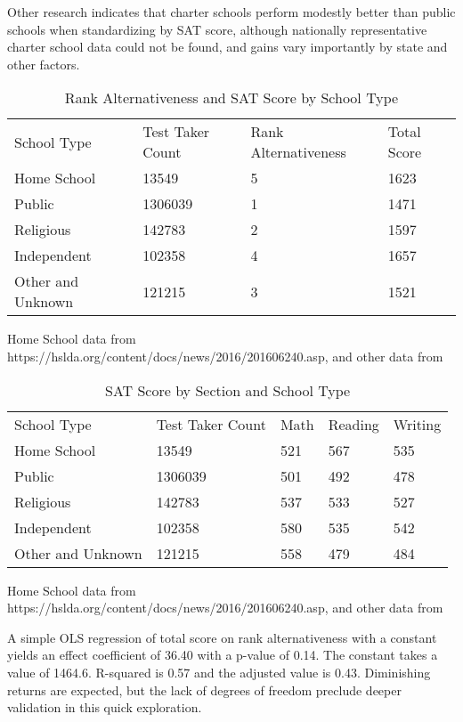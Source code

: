 \documentclass[AER]{/Users/zyl357/Documents/GitHub/research-dissertation-case-for-alt-ed/papers/alt-ed-survey/aea-latex-templates/AEA}
\begin{document}
Other research indicates that charter schools\cite{di2011evidence} perform modestly better than
public schools when standardizing by SAT score, although nationally
representative charter school data could not be found, and gains vary
importantly by state and other factors.

\begin{table}
\caption{Rank Alternativeness and SAT Score by School Type}
\begin{tabular}{llll}
School Type & Test Taker Count & Rank Alternativeness & Total Score \\
Home School & 13549 & 5 & 1623 \\
Public & 1306039 & 1 & 1471 \\
Religious & 142783 & 2 & 1597 \\
Independent & 102358 & 4 & 1657 \\
Other and Unknown & 121215 & 3 & 1521 %
\end{tabular}
\begin{tablenotes}[Source]
Home School data from https://hslda.org/content/docs/news/2016/201606240.asp,
and other data from \cite{collegeboard_2014} %
\end{tablenotes}
\end{table}

\begin{table}
\caption{SAT Score by Section and School Type}
\begin{tabular}{lllll}
School Type & Test Taker Count & Math & Reading & Writing \\
Home School & 13549 & 521 & 567 & 535 \\
Public & 1306039 & 501 & 492 & 478 \\
Religious & 142783 & 537 & 533 & 527 \\
Independent & 102358 & 580 & 535 & 542 \\
Other and Unknown & 121215 & 558 & 479 & 484 %
\end{tabular}
\begin{tablenotes}[Source]
Home School data from https://hslda.org/content/docs/news/2016/201606240.asp,
and other data from \cite{collegeboard_2014} %
\end{tablenotes}
\end{table}

A simple OLS regression of total score on rank alternativeness with a
constant yields an effect coefficient of 36.40 with a p-value of 0.14. The
constant takes a value of 1464.6. R-squared is 0.57 and the adjusted value
is 0.43. Diminishing returns are expected, but the lack of degrees of
freedom preclude deeper validation in this quick exploration.
\end{document}
